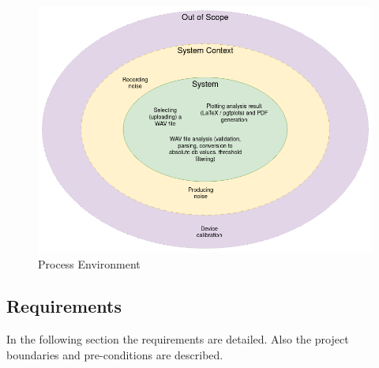 \begin{figure}[H]
    \centering
    \includegraphics[width=\textwidth]{../assets/process_environment.png}
    \caption{Process Environment}
\end{figure}

\subsection{Requirements}
In the following section the requirements are detailed. Also the project boundaries and pre-conditions are described.

